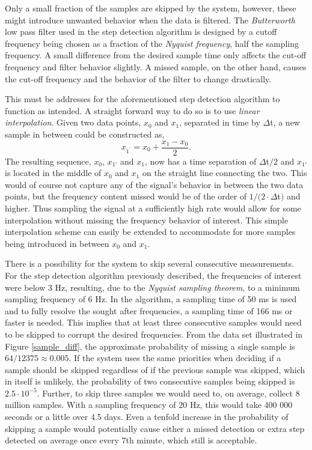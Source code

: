 \documentclass{LTHthesis}
\begin{document}
Only a small fraction of the samples are skipped by the system, however, these might introduce unwanted behavior when the data is filtered. The \emph{Butterworth} low pass filter used in the step detection algorithm is designed by a cutoff frequency being chosen as a fraction of the \emph{Nyquist frequency}, half the sampling frequency. A small difference from the desired sample time only affects the cut-off frequency and filter behavior slightly. A missed sample, on the other hand, causes the cut-off frequency and the behavior of the filter to change drastically. 

This must be addresses for the aforementioned step detection algorithm to function as intended. A straight forward way to do so is to use \emph{linear interpolation}.  Given two data points, $x_0$ and $x_1$, separated in time by $\Delta $t, a new sample in between could be constructed as,
%
\begin{equation}
x_{1^\prime}=x_0+\frac{x_1-x_0}{2}.
\end{equation}
%
The resulting sequence, $x_0$, $x_{1'}$ and $x_1$, now has a time separation of $\Delta $t$/2$ and $x_{1'}$ is located in the middle of $x_0$ and $x_1$ on the straight line connecting the two. This would of course not capture any of the signal's behavior in between the two data points, but the frequency content missed would be of the order of $1/(2\cdot\Delta$t$)$ and higher. Thus sampling the signal at a sufficiently high rate would allow for some interpolation without missing the frequency behavior of interest. This simple interpolation scheme can easily be extended to accommodate for more samples being introduced in between $x_0$ and $x_1$.

There is a possibility for the system to skip several consecutive measurements. For the step detection algorithm previously described, the frequencies of interest were below 3 Hz, resulting, due to the \emph{Nyquist sampling theorem}, to a minimum sampling frequency of 6 Hz. In the algorithm, a sampling time of  50 ms is used and to fully resolve the sought after frequencies, a sampling time of 166 ms or faster is needed. This implies that at least three consecutive samples would need to be skipped to corrupt the desired frequencies. From the data set illustrated in Figure \ref{sample_diff}, the approximate probability of missing a single sample is $64/12375\approx0.005$. If the system uses the same priorities when deciding if a sample should be skipped regardless of if the previous sample was skipped, which in itself is unlikely, the probability of two consecutive samples being skipped is $2.5\cdot10^{-5}$. Further, to skip three samples we would need to, on average, collect 8 million samples. With a sampling frequency of 20 Hz, this would take 400 000 seconds or a little over 4.5 days. Even a tenfold increase in the probability of skipping a sample would potentially cause either a missed detection or extra step detected on average once every 7th minute, which still is acceptable.              
%
\end{document}

